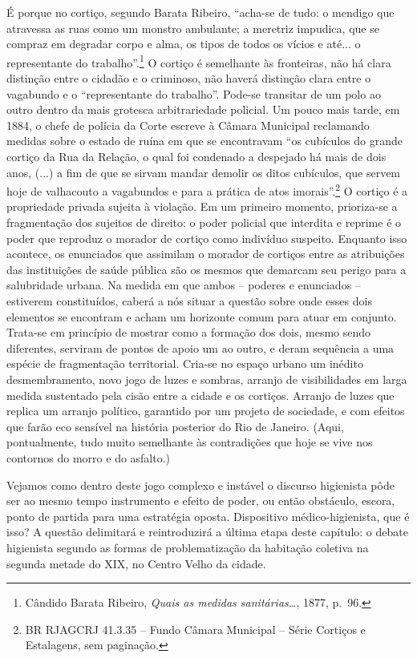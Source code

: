 É porque no cortiço, segundo Barata Ribeiro, ``acha-se de tudo: o
mendigo que atravessa as ruas como um monstro ambulante; a meretriz
impudica, que se compraz em degradar corpo e alma, os tipos de todos os
vícios e até... o representante do trabalho''.\footnote{Cândido Barata
  Ribeiro, \emph{Quais as medidas sanitárias\ldots{}}, 1877, p.~96.} O
cortiço é semelhante às fronteiras, não há clara distinção entre o
cidadão e o criminoso, não haverá distinção clara entre o vagabundo e o
``representante do trabalho''. Pode-se transitar de um polo ao outro
dentro da mais grotesca arbitrariedade policial. Um pouco mais tarde, em
1884, o chefe de polícia da Corte escreve à Câmara Municipal reclamando
medidas sobre o estado de ruína em que se encontravam ``os cubículos do
grande cortiço da Rua da Relação, o qual foi condenado a despejado há
mais de dois anos, (...) a fim de que se sirvam mandar demolir os ditos
cubículos, que servem hoje de valhacouto a vagabundos e para a prática
de atos imorais''.\footnote{BR RJAGCRJ 41.3.35 -- Fundo Câmara Municipal
  -- Série Cortiços e Estalagens, sem paginação.} O cortiço é a
propriedade privada sujeita à violação. Em um primeiro momento,
prioriza-se a fragmentação dos sujeitos de direito: o poder policial que
interdita e reprime é o poder que reproduz o morador de cortiço como
indivíduo suspeito. Enquanto isso acontece, os enunciados que assimilam
o morador de cortiços entre as atribuições das instituições de saúde
pública são os mesmos que demarcam seu perigo para a salubridade urbana.
Na medida em que ambos -- poderes e enunciados -- estiverem
constituídos, caberá a nós situar a questão sobre onde esses dois
elementos se encontram e acham um horizonte comum para atuar em
conjunto. Trata-se em princípio de mostrar como a formação dos dois,
mesmo sendo diferentes, serviram de pontos de apoio um ao outro, e deram
sequência a uma espécie de fragmentação territorial. Cria-se no espaço
urbano um inédito desmembramento, novo jogo de luzes e sombras, arranjo
de visibilidades em larga medida sustentado pela cisão entre a cidade e
os cortiços. Arranjo de luzes que replica um arranjo político, garantido
por um projeto de sociedade, e com efeitos que farão eco sensível na
história posterior do Rio de Janeiro. (Aqui, pontualmente, tudo muito
semelhante às contradições que hoje se vive nos contornos do morro e do
asfalto.)

Vejamos como dentro deste jogo complexo e instável o discurso higienista
pôde ser ao mesmo tempo instrumento e efeito de poder, ou então
obstáculo, escora, ponto de partida para uma estratégia oposta.
Dispositivo médico-higienista, que é isso? A questão delimitará e
reintroduzirá a última etapa deste capítulo: o debate higienista segundo
as formas de problematização da habitação coletiva na segunda metade do
XIX, no Centro Velho da cidade.

